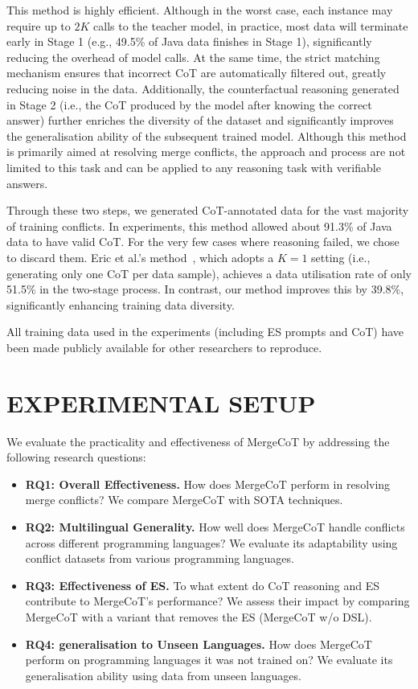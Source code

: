 \documentclass[sigconf,review,anonymous]{acmart}
\begin{document}
This method is highly efficient. Although in the worst case, each instance may require up to $2K$ calls to the teacher model, in practice, most data will terminate early in Stage 1 (e.g., 49.5\% of Java data finishes in Stage 1), significantly reducing the overhead of model calls. At the same time, the strict matching mechanism ensures that incorrect CoT are automatically filtered out, greatly reducing noise in the data. 
Additionally, the counterfactual reasoning generated in Stage 2 (i.e., the CoT produced by the model after knowing the correct answer) further enriches the diversity of the dataset and significantly improves the generalisation ability of the subsequent trained model. 
Although this method is primarily aimed at resolving merge conflicts, the approach and process are not limited to this task and can be applied to any reasoning task with verifiable answers.

Through these two steps, we generated CoT-annotated data for the vast majority of training conflicts. In experiments, this method allowed about 91.3\% of Java data to have valid CoT. For the very few cases where reasoning failed, we chose to discard them. Eric et al.’s method~\cite{star}, which adopts a $K=1$ setting (i.e., generating only one CoT per data sample), achieves a data utilisation rate of only 51.5\% in the two-stage process. In contrast, our method improves this by 39.8\%, significantly enhancing training data diversity.

All training data used in the experiments (including ES prompts and CoT) have been made publicly available for other researchers to reproduce.


\section{EXPERIMENTAL SETUP}

We evaluate the practicality and effectiveness of MergeCoT by addressing the following research questions:
\begin{itemize}
    \item \textbf{RQ1: Overall Effectiveness.} How does MergeCoT perform in resolving merge conflicts? We compare MergeCoT with SOTA techniques.
    \item \textbf{RQ2: Multilingual Generality.} How well does MergeCoT handle conflicts across different programming languages? We evaluate its adaptability using conflict datasets from various programming languages.
    \item \textbf{RQ3: Effectiveness of ES.} To what extent do CoT reasoning and ES contribute to MergeCoT’s performance? We assess their impact by comparing MergeCoT with a variant that removes the ES (MergeCoT w/o DSL).
    \item \textbf{RQ4: generalisation to Unseen Languages.} How does MergeCoT perform on programming languages it was not trained on? We evaluate its generalisation ability using data from unseen languages.
\end{itemize}
\end{document}
